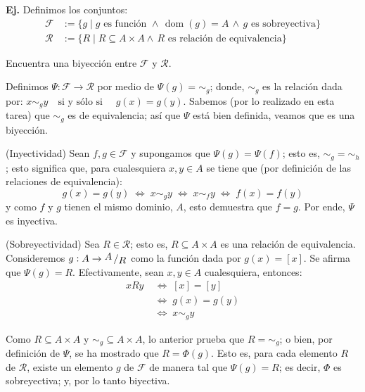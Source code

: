 \documentclass[letterpaper,DIV=14,headsepline,12pt]{scrartcl}
\makeatletter
\newcounter{Ejer}
\newcommand{\pts}{}
\newenvironment{ejercicio}[1]{\noindent
    \ifthenelse{\equal{#1}{1} \OR \equal{#1}{+1}}{\renewcommand{\pts}{\textbf{(#1 pt)}}}{\renewcommand{\pts}{\textbf{(#1 pts)}}}\textbf{Ej. \theEjer} \pts\stepcounter{Ejer}}{\vspace{.3cm}}
\DeclareMathOperator{\dom}{dom}
\newcommand{\quot}[2]{{\raisebox{.2em}{$#1$}\left/\raisebox{-.2em}{$#2$}\right.}}
\renewenvironment{proof}[1][]{%
        \par\pushQED{\qed}%
        \normalfont\topsep6pt \partopsep0pt %
        \trivlist
        \item[\hskip\labelsep
                \textbf{\textit{Demostración.}}%
        ]#1
        }{%
        \popQED\endtrivlist\@endpefalse
    }
\makeatother
\begin{document}
    \begin{ejercicio}{+2}
        Definimos los conjuntos:
        \begin{align*}
            \mathscr{F} & :=\{ g \mid g \text{ es función } \land \, \dom(g)=A \, \land \, g \text{ es sobreyectiva} \} \\
            \mathscr{R} & :=\{ R \mid R \subseteq A \times A \land \, R \text{ es relación de equivalencia} \}
        \end{align*}

        Encuentra una biyección entre $\mathscr{F}$ y $\mathscr{R}$.
    \end{ejercicio}
    \begin{proof}
        Definimos $\Psi: \mathscr{F} \to \mathscr{R}$ por medio de $\Psi(g)=\sim_g$; donde, $\sim_g$ es la relación dada por: $x \sim_g y \quad \text{si y sólo si } \quad g(x)=g(y)$. Sabemos (por lo realizado en esta tarea) que $\sim_g$ es de equivalencia; así que $\Psi$ está bien definida, veamos que es una biyección.

        (Inyectividad) Sean $f,g \in \mathscr{F}$ y supongamos que $\Psi(g) = \Psi(f)$; esto es, $\sim_g = \sim_h$; esto significa que, para cualesquiera $x,y \in A$ se tiene que (por definición de las relaciones de equivalencia):
        \[ g(x) = g(y) \; \Leftrightarrow \; x \sim_g y \; \Leftrightarrow \; x \sim_f y \; \Leftrightarrow \; f(x) = f(y)\]
        y como $f$ y $g$ tienen el mismo dominio, $A$, esto demuestra que $f=g$. Por ende, $\Psi$ es inyectiva.

        (Sobreyectividad) Sea $R \in \mathscr{R}$; esto es, $R \subseteq A \times A$ es una relación de equivalencia. Consideremos $g:A \to \quot{A}{R}$ como la función dada por $g(x)=[x]$. Se afirma que $\Psi(g)=R$. Efectivamente, sean $x,y \in A $ cualesquiera, entonces:
        \begin{align*}
            x R y & \; \Leftrightarrow \; [x] = [y] \tag*{(Comportamiento de las clases de equivalencia)} \\
            & \; \Leftrightarrow \; g(x) = g(y) \tag*{(Comportamiento de las clases de equivalencia)} \\
            & \; \Leftrightarrow \; x \sim_g y \tag*{(Definición de $\sim_g$)}
        \end{align*}

        Como $R \subseteq A \times A$ y $\sim_g \subseteq A \times A$, lo anterior prueba que $R=\sim_g$; o bien, por definición de $\Psi$, se ha mostrado que $R=\Phi(g)$. Esto es, para cada elemento $R$ de $\mathscr{R}$, existe un elemento $g$ de $\mathscr{F}$ de manera tal que $\Psi(g)=R$; es decir, $\Phi$ es sobreyectiva; y, por lo tanto biyectiva.
    \end{proof}
\end{document}
